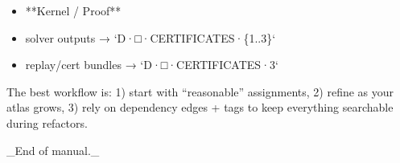\documentclass[11pt]{article}
\begin{document}
\begin{itemize}
\item **Kernel / Proof**
\item solver outputs → `D·□·CERTIFICATES·\{1..3\}`
\item replay/cert bundles → `D·□·CERTIFICATES·3`
\end{itemize}

The best workflow is:
1) start with “reasonable” assignments,  
2) refine as your atlas grows,  
3) rely on dependency edges + tags to keep everything searchable during refactors.

\_End of manual.\_
\end{document}
